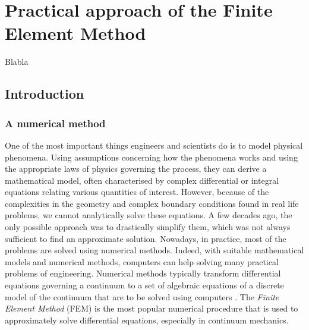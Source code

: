\chapter{Practical approach of the Finite Element Method}
\label{chap3}
\begin{shortAbstract}
Blabla
\end{shortAbstract}


\section{Introduction}

	\subsection{A numerical method}
One of the most important things engineers and scientists do is to model physical phenomena. Using assumptions concerning how the phenomena works and using the appropriate laws of physics governing the process, they can derive a mathematical model, often characterised by complex differential or integral equations relating various quantities of interest. However, because of the complexities in the geometry and complex boundary conditions found in real life problems, we cannot analytically solve these equations. A few decades ago, the only possible approach was to drastically simplify them, which was not always sufficient to find an approximate solution. Nowadays, in practice, most of the problems are solved using numerical methods. Indeed, with suitable mathematical models and numerical methods, computers can help solving many practical problems of engineering. Numerical methods typically transform differential equations governing a continuum to a set of algebraic equations of a discrete model of the continuum that are to be solved using computers \citep{Reddy93}. The \emph{Finite Element Method} (FEM) is the most popular numerical procedure that is used to approximately solve differential equations, especially in continuum mechanics. 
	
